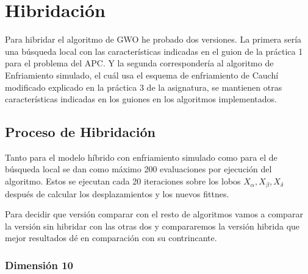 \documentclass[a4paper]{report}
\begin{document}
\section{Hibridación }

Para hibridar el algoritmo de GWO he probado dos versiones. La primera sería una búsqueda local con las características indicadas en el guion de la práctica 1 para el problema del APC. Y la segunda correspondería al algoritmo de Enfriamiento simulado, el cuál usa el esquema de enfriamiento de Cauchí modificado explicado en la práctica 3 de la asignatura, se mantienen otras características indicadas en los guiones en los algoritmos implementados.



\subsection{Proceso de Hibridación}

Tanto para el modelo híbrido con enfriamiento simulado como para el de búsqueda local se dan como máximo 200 evaluaciones por ejecución del algoritmo. Estos se ejecutan cada 20 iteraciones sobre los lobos $X_\alpha,X_\beta,X_\delta$ después de calcular los desplazamientos y los nuevos fittnes.

Para decidir que versión comparar con el resto de algoritmos vamos a comparar la versión sin hibridar con las otras dos y compararemos la versión hibrida que mejor resultados dé en comparación con su contrincante.


\subsubsection*{Dimensión 10}
\end{document}
